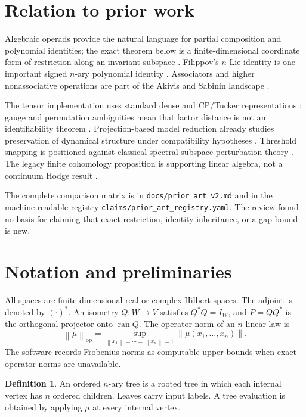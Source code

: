 \documentclass[11pt]{amsart}
\theoremstyle{definition}
\newtheorem{definition}[theorem]{Definition}
\newcommand{\ran}{\operatorname{ran}}
\newcommand{\op}{\operatorname{op}}
\newcommand{\norm}[1]{\left\lVert #1\right\rVert}
\begin{document}
\section{Relation to prior work}

Algebraic operads provide the natural language for partial composition and polynomial identities; the exact theorem below is a finite-dimensional coordinate form of restriction along an invariant subspace \cite{LodayVallette2012}. Filippov's \(n\)-Lie identity is one important signed \(n\)-ary polynomial identity \cite{Filippov1985}. Associators and higher nonassociative operations are part of the Akivis and Sabinin landscape \cite{MostovoyPerezIzquierdoShestakov2014}.

The tensor implementation uses standard dense and CP/Tucker representations \cite{KoldaBader2009,DeLathauwerDeMoorVandewalle2000}; gauge and permutation ambiguities mean that factor distance is not an identifiability theorem \cite{Kruskal1977}. Projection-based model reduction already studies preservation of dynamical structure under compatibility hypotheses \cite{EggerKuglerLiljegrenSailerMarheinekeMehrmann2018}. Threshold snapping is positioned against classical spectral-subspace perturbation theory \cite{DavisKahan1970}. The legacy finite cohomology proposition is supporting linear algebra, not a continuum Hodge result \cite{Dodziuk1976}.

The complete comparison matrix is in \texttt{docs/prior\_art\_v2.md} and in the machine-readable registry \texttt{claims/prior\_art\_registry.yaml}. The review found no basis for claiming that exact restriction, identity inheritance, or a gap bound is new.

\section{Notation and preliminaries}

All spaces are finite-dimensional real or complex Hilbert spaces. The adjoint is denoted by \((\cdot)^*\). An isometry \(Q:W\to V\) satisfies \(Q^*Q=I_W\), and \(P=QQ^*\) is the orthogonal projector onto \(\ran Q\). The operator norm of an \(n\)-linear law is
\[
\norm{\mu}_{\op}=\sup_{\norm{x_1}=\cdots=\norm{x_n}=1}\norm{\mu(x_1,\ldots,x_n)}.
\]
The software records Frobenius norms as computable upper bounds when exact operator norms are unavailable.

\begin{definition}
An ordered \(n\)-ary tree is a rooted tree in which each internal vertex has \(n\) ordered children. Leaves carry input labels. A tree evaluation is obtained by applying \(\mu\) at every internal vertex.
\end{definition}
\end{document}
